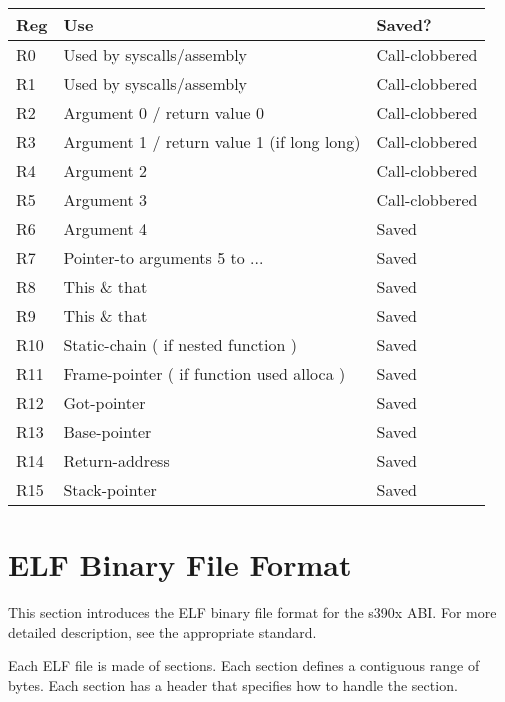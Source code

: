 \begin{center}
\begin{tabular}{|l|l|l|}
\hline
Reg   &   Use                                        &Saved? \\
\hline\hline
R0    &   Used by syscalls/assembly                  &Call-clobbered \\
R1    &   Used by syscalls/assembly                  &Call-clobbered \\
R2    &   Argument 0 / return value 0                &Call-clobbered \\
R3    &   Argument 1 / return value 1 (if long long) &Call-clobbered \\
R4    &   Argument 2                                 &Call-clobbered \\
R5    &   Argument 3                                 &Call-clobbered \\
R6    &   Argument 4                                 &Saved \\
R7    &   Pointer-to arguments 5 to ...              &Saved \\
R8    &   This \& that                               &Saved \\
R9    &   This \& that                               &Saved \\
R10   &   Static-chain ( if nested function )        &Saved \\
R11   &   Frame-pointer ( if function used alloca )  &Saved \\
R12   &   Got-pointer                                &Saved \\
R13   &   Base-pointer                               &Saved \\
R14   &   Return-address                             &Saved \\
R15   &   Stack-pointer                              &Saved \\
\hline
\end{tabular}
\end{center}

\section{ELF Binary File Format}
\label{sec:elf}
This section introduces the ELF binary file format for the s390x ABI.  For
more detailed description, see the appropriate standard.

\cbstart
Each ELF file is made of sections.  Each section defines a contiguous range
of bytes.  Each section has a header that specifies how to handle the
section.

